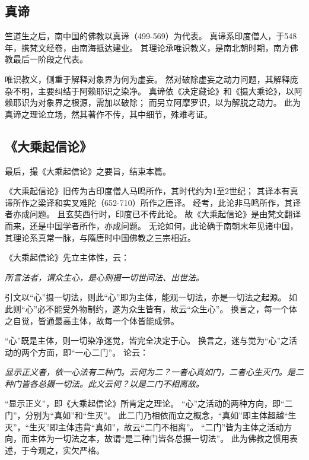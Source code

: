 \documentclass[11pt]{article}
\begin{document}
\subsection{真谛}
竺道生之后，南中国的佛教以真谛（499-569）为代表。
真谛系印度僧人，于548年，携梵文经卷，由南海抵达建业。
其理论承唯识教义，是南北朝时期，南方佛教最后一阶段之代表。

\newline

唯识教义，侧重于解释对象界为何为虚妄。
然对破除虚妄之动力问题，其解释庞杂不明，主要纠结于阿赖耶识之染净。
真谛依《决定藏论》和《摄大乘论》，以阿赖耶识为对象界之根源，需加以破除；
而另立阿摩罗识，以为解脱之动力。
此为真谛之理论立场，然其著作不传，其中细节，殊难考证。

\subsection{《大乘起信论》}
最后，撮《大乘起信论》之要旨，结束本篇。

\newline

《大乘起信论》旧传为古印度僧人马鸣所作，其时代约为1至2世纪；
其译本有真谛所作之梁译和实叉难陀（652-710）所作之唐译。
经考，此论非马鸣所作，其译者亦成问题。
且玄奘西行时，印度已不传此论。
故《大乘起信论》是由梵文翻译而来，还是中国学者所作，亦成问题。
无论如何，此论确于南朝末年见诸中国，其理论系真常一脉，与隋唐时中国佛教之三宗相近。

\newline

《大乘起信论》先立主体性，云：

\textit{所言法者，谓众生心，是心则摄一切世间法、出世法。}

引文以“心”摄一切法，则此“心”即为主体，能观一切法，亦是一切法之起源。
如此则“心”必不能受外物制约，遂为众生皆有，故云“众生心”。
换言之，每一个体之自觉，皆通最高主体，故每一个体皆能成佛。

\newline

“心”既是主体，则一切染净迷觉，皆完全决定于心。
换言之，迷与觉为“心”之活动的两个方面，即“一心二门”。
论云：

\textit{显示正义者，依一心法有二种门。云何为二？一者心真如门，二者心生灭门。是二种门皆各总摄一切法。此义云何？以是二门不相离故。}

“显示正义”，即《大乘起信论》所肯定之理论。
“心”之活动的两种方向，即“二门”，分别为“真如”和“生灭”。
此二门乃相依而立之概念，“真如”即主体超越“生灭”，“生灭”即主体违背“真如”，故云“二门不相离”。
“二门”皆为主体之活动方向，而主体为一切法之本，故谓“是二种门皆各总摄一切法”。
此为佛教之惯用表述，于今观之，实欠严格。
\end{document}
